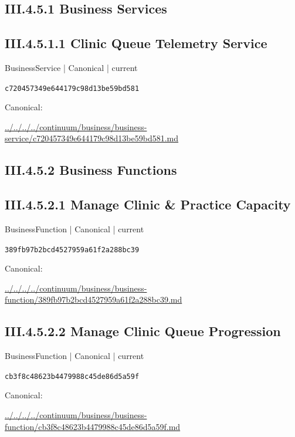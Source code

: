\documentclass[10pt,a4paper]{article}
\begin{document}
\subsection*{III.4.5.1 Business Services}
\subsection*{III.4.5.1.1 Clinic Queue Telemetry Service}
{\small BusinessService | Canonical | current}\par
\texttt{c720457349e644179c98d13be59bd581}\par
Canonical: \par
{\footnotesize\url{../../../../continuum/business/business-service/c720457349e644179c98d13be59bd581.md}}\par
\subsection*{III.4.5.2 Business Functions}
\subsection*{III.4.5.2.1 Manage Clinic \& Practice Capacity}
{\small BusinessFunction | Canonical | current}\par
\texttt{389fb97b2bcd4527959a61f2a288bc39}\par
Canonical: \par
{\footnotesize\url{../../../../continuum/business/business-function/389fb97b2bcd4527959a61f2a288bc39.md}}\par
\subsection*{III.4.5.2.2 Manage Clinic Queue Progression}
{\small BusinessFunction | Canonical | current}\par
\texttt{cb3f8c48623b4479988c45de86d5a59f}\par
Canonical: \par
{\footnotesize\url{../../../../continuum/business/business-function/cb3f8c48623b4479988c45de86d5a59f.md}}\par
\end{document}

